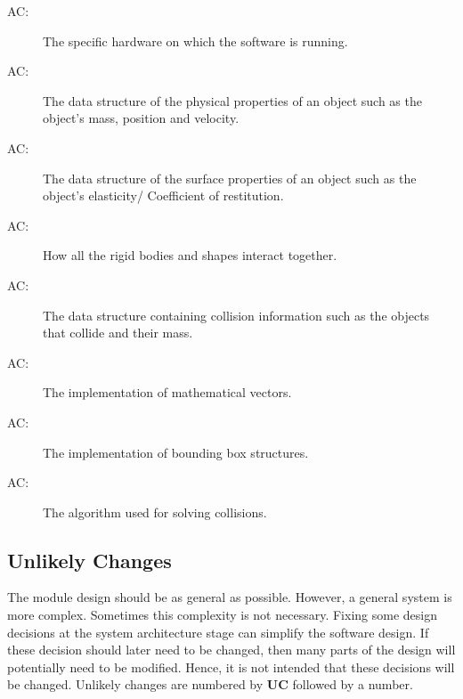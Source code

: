 \documentclass[12pt]{article}
\newcounter{acnum}
\newcommand{\actheacnum}{AC\theacnum}
\begin{document}
\begin{description}
\item[ \actheacnum \label{acHardware}:] The specific
  hardware on which the software is running.
\item[ \actheacnum \label{acBody}:] The data structure of the
physical properties of an object such as the object's mass, position and velocity.
\item[ \actheacnum \label{acShape}:] The data structure of the
surface properties of an object such as the object's elasticity/ Coefficient of restitution.
\item[ \actheacnum \label{acSpace}:] How all the rigid
bodies and shapes interact together.
\item[ \actheacnum \label{acCollision}:] The data structure containing collision information such as the objects that collide and their mass. 
\item[ \actheacnum \label{acVector}:] The implementation of mathematical vectors.
\item[ \actheacnum \label{acBBox}:] The implementation of bounding box structures.
\item[ \actheacnum \label{acSolver}:] The algorithm used for solving collisions.

\end{description}

\subsection{Unlikely Changes} \label{SecUchange}

The module design should be as general as possible. However, a general system is
more complex. Sometimes this complexity is not necessary. Fixing some design
decisions at the system architecture stage can simplify the software design. If
these decision should later need to be changed, then many parts of the design
will potentially need to be modified. Hence, it is not intended that these
decisions will be changed.  Unlikely changes are numbered by \textbf{UC}
followed by a number.
\end{document}
